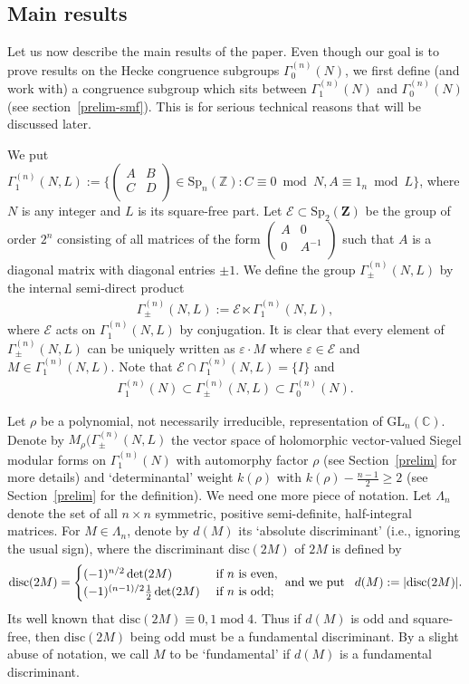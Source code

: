 \documentclass[11pt]{amsart}
\numberwithin{equation}{section}
\newcommand{\mbb}{\mathbb}
\newcommand{\mc}{\mathcal}
\newcommand{\mf}{\mathbf}
\newcommand{\mrm}{\mathrm} %
\newcommand{\smat}[4]{\left( \begin{smallmatrix} #1 & #2 \\ #3 & #4 \\ \end{smallmatrix} \right)}
\renewcommand*{\mod}{\operatorname{mod}}
\newcommand{\sptwo}{\mrm{Sp}_2( \mf Z)}
\newcommand{\Mrho}[2]{M_\rho(\Gamma_\pm^{(#1)}(#2, L)}
\begin{document}
\subsection{Main results}\label{sec:mainresults}
Let us now describe the main results of the paper. Even though our goal is to prove results on the Hecke congruence subgroups $\Gamma_0^{(n)}(N)$, we first define (and work with) a congruence subgroup which sits between $ \Gamma_1^{(n)}(N)$ and $\Gamma_0^{(n)}(N)$ (see section~\ref{prelim-smf}). This is for serious technical reasons that will be discussed later.

We put $\displaystyle \Gamma_1^{(n)}(N, L):= \{\smat{A}{B}{C}{D}\in\mrm{Sp}_n(\mbb Z): C\equiv 0\bmod N, A\equiv 1_n\bmod L  \}$,  where $N$ is any integer and $L$ is its square-free part.
Let $\mc E \subset\sptwo$ be the group of order $2^n$ consisting of all matrices of the form $\displaystyle \smat{A}{0}{0}{A^{-1}}$ such that $A $ is a diagonal matrix with diagonal entries $\pm 1$.
We define the group $\Gamma_\pm^{(n)}(N,L)$ by the internal semi-direct product 
\begin{align} \label{gamma-pm}
    \Gamma_\pm^{(n)}(N,L):= \mc E \ltimes \Gamma_1^{(n)}(N,L),
\end{align}
where $\mc E$ acts on $\Gamma_1^{(n)}(N,L)$ by conjugation. It is clear that every element of $\Gamma_\pm^{(n)}(N,L)$ can be uniquely written as $\varepsilon \cdot M$ where $\varepsilon \in \mc E$ and $M \in \Gamma_1^{(n)}(N,L)$. Note that $\mc E \cap \Gamma_1^{(n)}(N,L)=\{I\}$ and
\begin{align}
     \Gamma_1^{(n)}(N)\subset\Gamma_{\pm}^{(n)}(N,L)\subset \Gamma_0^{(n)}(N). 
\end{align}

Let $\rho$ be a polynomial, not necessarily irreducible,  representation of $ \mrm{GL}_n(\mbb C)$. Denote by $\Mrho{n}{N}$ the vector space of holomorphic vector-valued Siegel modular forms on $\Gamma_1^{(n)}(N)$ with automorphy factor $\rho$ (see Section~\ref{prelim} for more details) and `determinantal' weight $k(\rho) $ with $k(\rho) - \frac{n-1}{2} \ge 2 $ (see Section~\ref{prelim} for the definition). We need one more piece of notation. Let $\Lambda_n$ denote the set of all $n\times n$ symmetric, positive semi-definite, half-integral matrices.
For $M \in \Lambda_n$, denote by $d(M)$ its `absolute discriminant' (i.e., ignoring the usual sign), where the discriminant $\mrm{disc}(2M)$ of $2M$ is defined by 
\begin{equation} \label{disc}
 \mrm{disc}(2M)= \begin{cases}    (-1)^{n/2}\det(2M) &\text{ if } n \text{ is even,} \\
(-1)^{(n-1)/2}\frac{1}{2} \det(2M) &\text{ if } n \text{ is odd}; \end{cases} \text{
and we put 
 \, } d(M):=|\mrm{disc}(2M)|.
\end{equation}
Its well known that $\mrm{disc}(2M) \equiv 0,1 \mod 4$. Thus if $d(M)$ is odd and square-free, then $\mrm{disc}(2M)$ being odd must be a fundamental discriminant. By a slight abuse of notation, we call $M$ to be `fundamental' if $d(M)$ is a fundamental discriminant.
\end{document}
